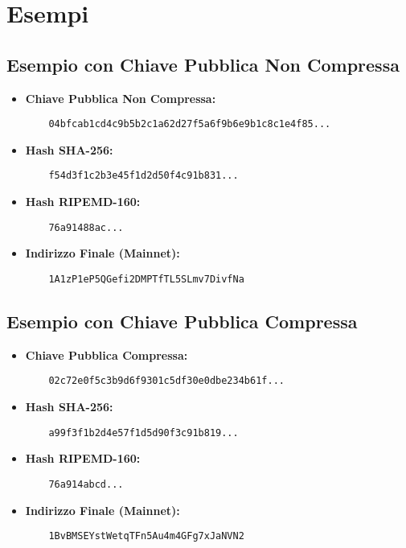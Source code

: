 \documentclass[a4paper,12pt]{article}
\begin{document}
\section{Esempi}
\subsection{Esempio con Chiave Pubblica Non Compressa}
\begin{itemize}
    \item \textbf{Chiave Pubblica Non Compressa:} 
    \begin{verbatim}
    04bfcab1cd4c9b5b2c1a62d27f5a6f9b6e9b1c8c1e4f85...
    \end{verbatim}
    \item \textbf{Hash SHA-256:} 
    \begin{verbatim}
    f54d3f1c2b3e45f1d2d50f4c91b831...
    \end{verbatim}
    \item \textbf{Hash RIPEMD-160:} 
    \begin{verbatim}
    76a91488ac...
    \end{verbatim}
    \item \textbf{Indirizzo Finale (Mainnet):} 
    \begin{verbatim}
    1A1zP1eP5QGefi2DMPTfTL5SLmv7DivfNa
    \end{verbatim}
\end{itemize}

\subsection{Esempio con Chiave Pubblica Compressa}
\begin{itemize}
    \item \textbf{Chiave Pubblica Compressa:} 
    \begin{verbatim}
    02c72e0f5c3b9d6f9301c5df30e0dbe234b61f...
    \end{verbatim}
    \item \textbf{Hash SHA-256:} 
    \begin{verbatim}
    a99f3f1b2d4e57f1d5d90f3c91b819...
    \end{verbatim}
    \item \textbf{Hash RIPEMD-160:} 
    \begin{verbatim}
    76a914abcd...
    \end{verbatim}
    \item \textbf{Indirizzo Finale (Mainnet):} 
    \begin{verbatim}
    1BvBMSEYstWetqTFn5Au4m4GFg7xJaNVN2
    \end{verbatim}
\end{itemize}
\end{document}
